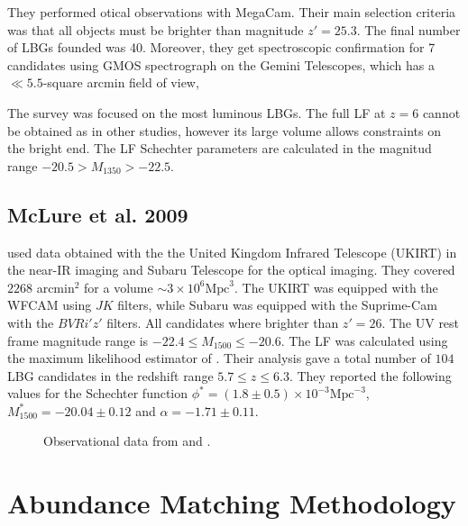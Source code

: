 \documentclass{emulateapj}
\begin{document}
They performed otical observations with MegaCam.
Their main selection criteria was that all objects must be brighter
than magnitude $z' = 25.3$. 
The final  number of LBGs founded was 40. 
Moreover, they get spectroscopic confirmation 
for 7 candidates using GMOS spectrograph on the Gemini Telescopes, which 
has a $\ll 5.5$-square arcmin field of view, 

The survey was focused on the most luminous LBGs. 
The full LF at $z=6$ cannot be obtained as in other studies, however
its large volume allows constraints on the bright end.
The LF Schechter parameters are calculated in the magnitud range 
$-20.5 > M_{1350} > -22.5$.

\subsection{McLure et al. 2009}

\citet{McLure09} used data obtained with the 
the United Kingdom Infrared Telescope (UKIRT) in the near-IR imaging
and Subaru Telescope for the optical imaging. 
They covered $2268$ arcmin$^{2}$  for a volume $\sim 3 \times 10^6 \textrm{Mpc}^3$.
The UKIRT was equipped with the WFCAM using $J K$ filters, while Subaru was 
equipped with the Suprime-Cam with the $B V R i' z'$ filters. 
All candidates  where brighter than $z'=26$. 
The UV rest frame magnitude range is 
$-22.4\leq M_{1500} \leq-20.6$. 
The LF was calculated using the maximum 
likelihood estimator of \citet{Schmidt68}. 
Their analysis gave a total number of 
$104$ LBG candidates in the redshift range $5.7\leq z \leq 6.3$. 
They reported the following values for the Schechter function
$\phi^* =(1.8\pm 0.5)\times 10 ^{-3} \textrm{Mpc}^{-3}$, 
$M^*_{1500} = -20.04\pm 0.12$ and $\alpha = -1.71 \pm 0.11$. 


\begin{figure}
\caption{Observational data from \cite{Bouwens15,McLure09}and \cite{Willott13}.}
\label{graph_observational_data}
\end{figure}


\section{Abundance Matching Methodology}
\label{sec:methodology}
\end{document}
